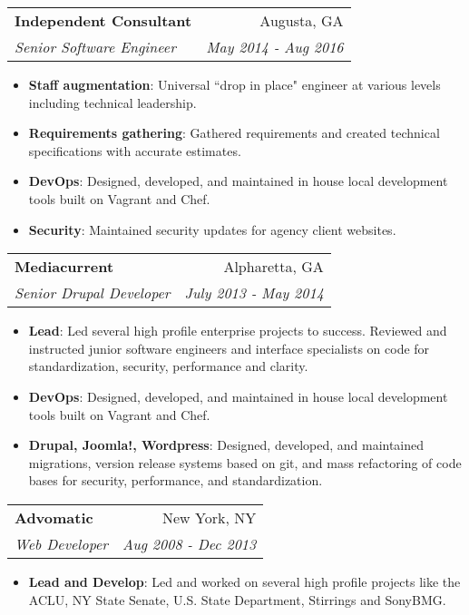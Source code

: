 \documentclass[letterpaper,11pt]{article}
\makeatletter
\newcommand{\resumeItem}[2]{
  \item\small{
    \textbf{#1}{: #2 \vspace{-2pt}}
  }
}
\newcommand{\resumeSubheading}[4]{
  \vspace{-1pt}\item
    \begin{tabular*}{0.97\textwidth}{l@{\extracolsep{\fill}}r}
      \textbf{#1} & #2 \\
      \textit{\small#3} & \textit{\small #4} \\
    \end{tabular*}\vspace{-5pt}
}
\newcommand{\resumeItemListStart}{\begin{itemize}}
\newcommand{\resumeItemListEnd}{\end{itemize}\vspace{-5pt}}
\makeatother
\begin{document}
    \resumeSubheading
      {Independent Consultant}{Augusta, GA}
      {Senior Software Engineer}{May 2014 - Aug 2016}
      \resumeItemListStart
        \resumeItem{Staff augmentation}
          {Universal ``drop in place" engineer at various levels including technical leadership.}
        \resumeItem{Requirements gathering}
          {Gathered requirements and created technical specifications with accurate estimates.}
        \resumeItem{DevOps}
          {Designed, developed, and maintained in house local development tools built on Vagrant and Chef.}
        \resumeItem{Security}
          {Maintained security updates for agency client websites.}
      \resumeItemListEnd

    \resumeSubheading
      {Mediacurrent}{Alpharetta, GA}
      {Senior Drupal Developer}{July 2013 - May 2014}
      \resumeItemListStart
        \resumeItem{Lead}
          {Led several high profile enterprise projects to success. Reviewed and instructed junior software engineers and interface specialists on code for standardization, security, performance and clarity.}
        \resumeItem{DevOps}
          {Designed, developed, and maintained in house local development tools built on Vagrant and Chef.}
        \resumeItem{Drupal, Joomla!, Wordpress}
          {Designed, developed, and maintained migrations, version release systems based on git, and mass refactoring of code bases for security, performance, and standardization.}
      \resumeItemListEnd

    \resumeSubheading
      {Advomatic}{New York, NY}
      {Web Developer}{Aug 2008 - Dec 2013}
      \resumeItemListStart
        \resumeItem{Lead and Develop}
          {Led and worked on several high profile projects like the ACLU, NY State Senate, U.S. State Department, Stirrings and SonyBMG.}
      \resumeItemListEnd

\end{document}
